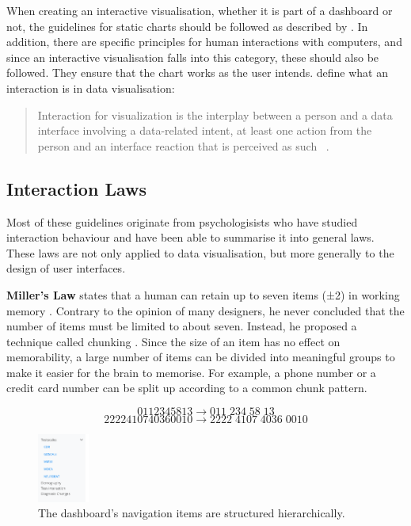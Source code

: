 \documentclass[11pt]{article}
\begin{document}
When creating an interactive visualisation, whether it is part of a dashboard or not, the guidelines for static charts should be followed as described by \textcite{weibel_fundamentals_2021}. In addition, there are specific principles for human interactions with computers, and since an interactive visualisation falls into this category, these should also be followed. They ensure that the chart works as the user intends. \textcite{dimara_what_2020} define what an interaction is in data visualisation:

\begin{quote}
    Interaction for visualization is the interplay between a person and a data interface involving a data-related intent, at least one action from the person and an interface reaction that is perceived as such ~\parencite{dimara_what_2020}.
\end{quote}

\subsection{Interaction Laws}

Most of these guidelines originate from psychologisists who have studied interaction behaviour and have been able to summarise it into general laws. These laws are not only applied to data visualisation, but more generally to the design of user interfaces.

\textbf{Miller's Law} states that a human can retain up to seven items (±2) in working memory \parencite{miller_magical_1956}. Contrary to the opinion of many designers, he never concluded that the number of items must be limited to about seven. Instead, he proposed a technique called chunking \parencite{yablonski_millers_2020}. Since the size of an item has no effect on memorability, a large number of items can be divided into meaningful groups to make it easier for the brain to memorise. For example, a phone number or a credit card number can be split up according to a common chunk pattern.

\begin{multicols}{2}
    \noindent
    $$0112345813 \rightarrow 011\;234\;58\;13$$
    $$2222410740360010 \rightarrow 2222\;4107\;4036\;0010$$
\end{multicols}

\begin{figure}
    \includegraphics[width=0.15\textwidth]{./menu-collapsible.png}
    \caption{The dashboard's navigation items are structured hierarchically.}
    \label{menu-collapsible}
\end{figure}
\end{document}
